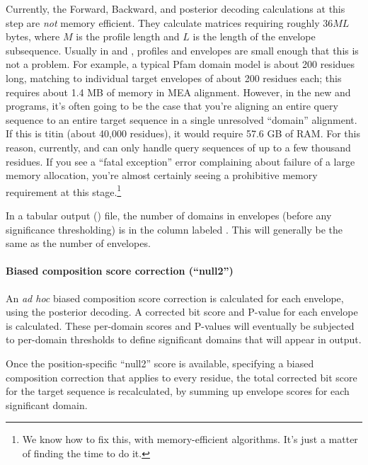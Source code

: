 Currently, the Forward, Backward, and posterior decoding calculations
at this step are \emph{not} memory efficient. They calculate matrices
requiring roughly $36 ML$ bytes, where $M$ is the profile length and
$L$ is the length of the envelope subsequence. Usually in
 and , profiles and envelopes are small
enough that this is not a problem. For example, a typical Pfam domain
model is about 200 residues long, matching to individual target
envelopes of about 200 residues each; this requires about 1.4 MB of
memory in MEA alignment. However, in the new  and
 programs, it's often going to be the case that you're
aligning an entire query sequence to an entire target sequence in a
single unresolved ``domain'' alignment. If this is titin (about 40,000
residues), it would require 57.6 GB of RAM. For this reason,
currently,  and  can only handle query
sequences of up to a few thousand residues. If you see a ``fatal
exception'' error complaining about failure of a large memory
allocation, you're almost certainly seeing a prohibitive memory
requirement at this stage.\footnote{We know how to fix this, with
  memory-efficient algorithms. It's just a matter of finding the time
  to do it.}

In a tabular output () file, the number of domains in
envelopes (before any significance thresholding) is in the column
labeled . This will generally be the same as the number of
envelopes.

\paragraph{Biased composition score correction (``null2'')}
An \emph{ad hoc} biased composition score correction is calculated for
each envelope, using the posterior decoding. A corrected bit score and
P-value for each envelope is calculated. These per-domain scores and
P-values will eventually be subjected to per-domain thresholds to
define significant domains that will appear in output.

Once the position-specific ``null2'' score is available, specifying a
biased composition correction that applies to every residue, the total
corrected bit score for the target sequence is recalculated, by
summing up envelope scores for each significant domain.




